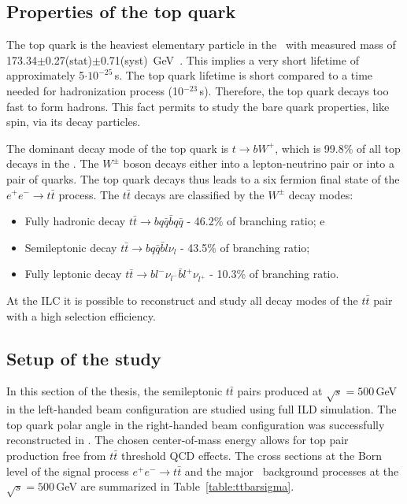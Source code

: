 \subsection{Properties of the top quark}

The top quark is the heaviest elementary particle in the \sm\ with measured mass of 173.34$\pm$0.27(stat)$\pm$0.71(syst) \,GeV~\cite{bib:TopMass}. This implies a very short lifetime of approximately 5$\cdot10^{-25}$\,s.
The top quark lifetime is short compared to a time needed for hadronization process  (10$^{-23}$\,s). Therefore, the top quark decays too fast to form hadrons. 
This fact permits to study the bare quark properties, like spin, via its decay particles. 

The dominant decay mode of the top quark is $t\to bW^+$, which is 99.8\% of all top decays in the \sm. The $W^\pm$ boson decays either into a lepton-neutrino pair or into a pair of quarks. The top quark decays thus leads to a six fermion final state of the $e^+e^-\to t\bar{t}$ process.
The $t\bar{t}$  decays are classified by the $W^\pm$ decay modes:
\begin{itemize}
	\item Fully hadronic decay $t\bar{t} \to bq\bar{q} \bar{b} q\bar{q}$ -  46.2\% of branching ratio;
e	\item Semileptonic decay $t\bar{t} \to bq\bar{q} \bar{b} l\nu_l$ - 43.5\% of branching ratio;
	\item Fully leptonic decay $t\bar{t} \to b l^- \nu_{l^-} \bar{b} l^+\nu_{l^+}$ - 10.3\% of branching ratio.	
\end{itemize}


At the ILC it is possible to reconstruct and study all decay modes of the $t\bar{t}$ pair with a high selection efficiency.
\subsection{Setup of the study}
In this section of the thesis, the semileptonic $t\bar{t}$ pairs produced at $\sqrt{s}=500$\,GeV in the left-handed beam configuration are studied using full ILD simulation.
The top quark polar angle in the right-handed beam configuration was successfully reconstructed in \cite{bib:Doublet}\cite{bib:ILCTOP}.
The chosen center-of-mass energy allows for top pair production free from $t\bar{t}$ threshold QCD effects.
The cross sections at the Born level of the signal process $e^+e^- \to t\bar{t}$ and the major \small\ background processes at the $\sqrt{s} = 500$\,GeV are summarized in Table~\ref{table:ttbarsigma}.

